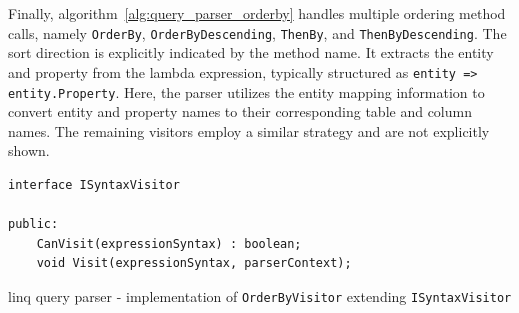 Finally, algorithm~\ref{alg:query_parser_orderby} handles multiple ordering method calls, namely \texttt{OrderBy}, \texttt{OrderByDescending}, \texttt{ThenBy}, and \texttt{ThenByDescending}. The sort direction is explicitly indicated by the method name. It extracts the entity and property from the lambda expression, typically structured as \texttt{entity => entity.Property}. Here, the parser utilizes the entity mapping information to convert entity and property names to their corresponding table and column names. The remaining visitors employ a similar strategy and are not explicitly shown.

  \begin{lstlisting}[caption={ISyntaxVisitor interface structure}, language=pseudo, label={lst:syntaxvisitor}]
interface ISyntaxVisitor

public:
    CanVisit(expressionSyntax) : boolean;
    void Visit(expressionSyntax, parserContext);
 \end{lstlisting}

\begin{algorithm}[!htp]
    \footnotesize
    \DontPrintSemicolon



    \caption{\acrshort{linq} query parser - implementation of \texttt{OrderByVisitor} extending \texttt{ISyntaxVisitor}}
    \label{alg:query_parser_orderby}
\end{algorithm}
    


